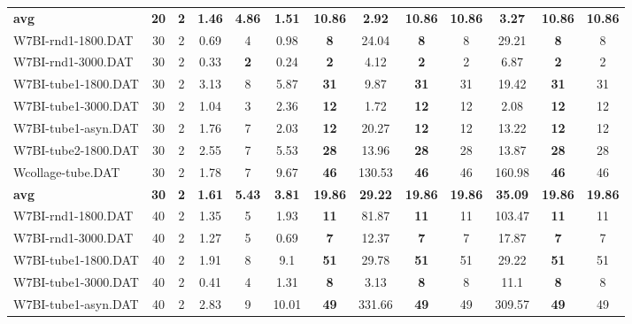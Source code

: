 \begin{table}[h]
{\begin{tabular}{lcccccccccccc}
\cline{1-13} \textbf{avg} & \textbf{20} & \textbf{2} & \textbf{1.46} & \textbf{4.86} & \textbf{1.51} & \textbf{10.86} & \textbf{2.92} & \textbf{10.86} & \textbf{10.86} & \textbf{3.27} & \textbf{10.86} & \textbf{10.86} \\ \cline{1-13}
W7BI-rnd1-1800.DAT & 30 & 2 &  \textcolor{blue2}{0.69} & 4 & 0.98 &  \textbf{8} & 24.04 &  \textbf{8} & 8 & 29.21 &  \textbf{8} & 8 \\
W7BI-rnd1-3000.DAT & 30 & 2 & 0.33 &  \textbf{2} &  \textcolor{blue2}{0.24} &  \textbf{2} & 4.12 &  \textbf{2} & 2 & 6.87 &  \textbf{2} & 2 \\
W7BI-tube1-1800.DAT & 30 & 2 &  \textcolor{blue2}{3.13} & 8 & 5.87 &  \textbf{31} & 9.87 &  \textbf{31} & 31 & 19.42 &  \textbf{31} & 31 \\
W7BI-tube1-3000.DAT & 30 & 2 &  \textcolor{blue2}{1.04} & 3 & 2.36 &  \textbf{12} & 1.72 &  \textbf{12} & 12 & 2.08 &  \textbf{12} & 12 \\
W7BI-tube1-asyn.DAT & 30 & 2 &  \textcolor{blue2}{1.76} & 7 & 2.03 &  \textbf{12} & 20.27 &  \textbf{12} & 12 & 13.22 &  \textbf{12} & 12 \\
W7BI-tube2-1800.DAT & 30 & 2 &  \textcolor{blue2}{2.55} & 7 & 5.53 &  \textbf{28} & 13.96 &  \textbf{28} & 28 & 13.87 &  \textbf{28} & 28 \\
Wcollage-tube.DAT & 30 & 2 &  \textcolor{blue2}{1.78} & 7 & 9.67 &  \textbf{46} & 130.53 &  \textbf{46} & 46 & 160.98 &  \textbf{46} & 46 \\
\cline{1-13} \textbf{avg} & \textbf{30} & \textbf{2} & \textbf{1.61} & \textbf{5.43} & \textbf{3.81} & \textbf{19.86} & \textbf{29.22} & \textbf{19.86} & \textbf{19.86} & \textbf{35.09} & \textbf{19.86} & \textbf{19.86} \\ \cline{1-13}
W7BI-rnd1-1800.DAT & 40 & 2 &  \textcolor{blue2}{1.35} & 5 & 1.93 &  \textbf{11} & 81.87 &  \textbf{11} & 11 & 103.47 &  \textbf{11} & 11 \\
W7BI-rnd1-3000.DAT & 40 & 2 & 1.27 & 5 &  \textcolor{blue2}{0.69} &  \textbf{7} & 12.37 &  \textbf{7} & 7 & 17.87 &  \textbf{7} & 7 \\
W7BI-tube1-1800.DAT & 40 & 2 &  \textcolor{blue2}{1.91} & 8 & 9.1 &  \textbf{51} & 29.78 &  \textbf{51} & 51 & 29.22 &  \textbf{51} & 51 \\
W7BI-tube1-3000.DAT & 40 & 2 &  \textcolor{blue2}{0.41} & 4 & 1.31 &  \textbf{8} & 3.13 &  \textbf{8} & 8 & 11.1 &  \textbf{8} & 8 \\
W7BI-tube1-asyn.DAT & 40 & 2 &  \textcolor{blue2}{2.83} & 9 & 10.01 &  \textbf{49} & 331.66 &  \textbf{49} & 49 & 309.57 &  \textbf{49} & 49 \\

\end{tabular}}
\end{table}
